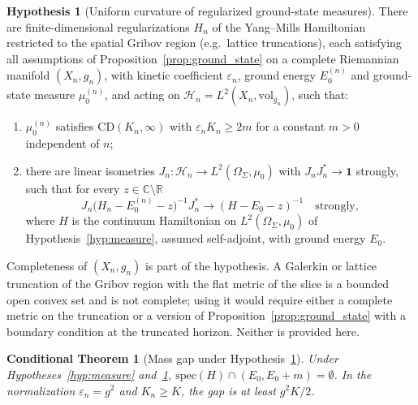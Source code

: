 \documentclass[11pt,a4paper]{amsart}
\newtheorem{condtheorem}[theorem]{Conditional Theorem}
\theoremstyle{definition}
\newtheorem{hypothesis}[theorem]{Hypothesis}
\newcommand{\R}{\mathbb{R}}
\newcommand{\C}{\mathbb{C}}
\newcommand{\cH}{\mathcal{H}}
\begin{document}
\begin{hypothesis}[Uniform curvature of regularized ground-state measures]
\label{hyp:cd}
There are finite-dimensional regularizations $H_n$ of the Yang--Mills Hamiltonian restricted to the spatial Gribov region (e.g.\ lattice truncations), each satisfying all assumptions of Proposition~\ref{prop:ground_state} on a complete Riemannian manifold $(X_n, g_n)$, with kinetic coefficient $\varepsilon_n$, ground energy $E_0^{(n)}$ and ground-state measure $\mu_0^{(n)}$, and acting on $\cH_n = L^2(X_n, \mathrm{vol}_{g_n})$, such that:
\begin{enumerate}[label=(\alph*)]
    \item $\mu_0^{(n)}$ satisfies $\mathrm{CD}(K_n,\infty)$ with $\varepsilon_n K_n \ge 2m$ for a constant $m > 0$ independent of $n$;
    \item there are linear isometries $J_n : \cH_n \to L^2(\Omega_\Sigma,\mu_0)$ with $J_n J_n^* \to \mathbf{1}$ strongly, such that for every $z \in \C\setminus\R$
    \begin{equation}
        J_n \big(H_n - E_0^{(n)} - z\big)^{-1} J_n^* \longrightarrow (H - E_0 - z)^{-1} \quad \text{strongly},
    \end{equation}
    where $H$ is the continuum Hamiltonian on $L^2(\Omega_\Sigma,\mu_0)$ of Hypothesis~\ref{hyp:measure}, assumed self-adjoint, with ground energy $E_0$.
\end{enumerate}
\end{hypothesis}

Completeness of $(X_n, g_n)$ is part of the hypothesis. A Galerkin or lattice truncation of the Gribov region with the flat metric of the slice is a bounded open convex set and is not complete; using it would require either a complete metric on the truncation or a version of Proposition~\ref{prop:ground_state} with a boundary condition at the truncated horizon. Neither is provided here.

\begin{condtheorem}[Mass gap under Hypothesis~\ref{hyp:cd}]
\label{thm:conditional_gap}
Under Hypotheses~\ref{hyp:measure} and~\ref{hyp:cd}, $\mathrm{spec}(H) \cap (E_0, E_0 + m) = \emptyset$. In the normalization $\varepsilon_n = g^2$ and $K_n \ge K$, the gap is at least $g^2K/2$.
\end{condtheorem}
\end{document}
